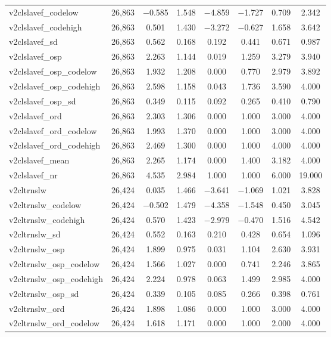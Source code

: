 \begin{table}[!htbp]
\begin{tabular}{@{\extracolsep{5pt}}lccccccc}
v2clslavef\_codelow & 26,863 & $-$0.585 & 1.548 & $-$4.859 & $-$1.727 & 0.709 & 2.342 \\ 
v2clslavef\_codehigh & 26,863 & 0.501 & 1.430 & $-$3.272 & $-$0.627 & 1.658 & 3.642 \\ 
v2clslavef\_sd & 26,863 & 0.562 & 0.168 & 0.192 & 0.441 & 0.671 & 0.987 \\ 
v2clslavef\_osp & 26,863 & 2.263 & 1.144 & 0.019 & 1.259 & 3.279 & 3.940 \\ 
v2clslavef\_osp\_codelow & 26,863 & 1.932 & 1.208 & 0.000 & 0.770 & 2.979 & 3.892 \\ 
v2clslavef\_osp\_codehigh & 26,863 & 2.598 & 1.158 & 0.043 & 1.736 & 3.590 & 4.000 \\ 
v2clslavef\_osp\_sd & 26,863 & 0.349 & 0.115 & 0.092 & 0.265 & 0.410 & 0.790 \\ 
v2clslavef\_ord & 26,863 & 2.303 & 1.306 & 0.000 & 1.000 & 3.000 & 4.000 \\ 
v2clslavef\_ord\_codelow & 26,863 & 1.993 & 1.370 & 0.000 & 1.000 & 3.000 & 4.000 \\ 
v2clslavef\_ord\_codehigh & 26,863 & 2.469 & 1.300 & 0.000 & 1.000 & 4.000 & 4.000 \\ 
v2clslavef\_mean & 26,863 & 2.265 & 1.174 & 0.000 & 1.400 & 3.182 & 4.000 \\ 
v2clslavef\_nr & 26,863 & 4.535 & 2.984 & 1.000 & 1.000 & 6.000 & 19.000 \\ 
v2cltrnslw & 26,424 & 0.035 & 1.466 & $-$3.641 & $-$1.069 & 1.021 & 3.828 \\ 
v2cltrnslw\_codelow & 26,424 & $-$0.502 & 1.479 & $-$4.358 & $-$1.548 & 0.450 & 3.045 \\ 
v2cltrnslw\_codehigh & 26,424 & 0.570 & 1.423 & $-$2.979 & $-$0.470 & 1.516 & 4.542 \\ 
v2cltrnslw\_sd & 26,424 & 0.552 & 0.163 & 0.210 & 0.428 & 0.654 & 1.096 \\ 
v2cltrnslw\_osp & 26,424 & 1.899 & 0.975 & 0.031 & 1.104 & 2.630 & 3.931 \\ 
v2cltrnslw\_osp\_codelow & 26,424 & 1.566 & 1.027 & 0.000 & 0.741 & 2.246 & 3.865 \\ 
v2cltrnslw\_osp\_codehigh & 26,424 & 2.224 & 0.978 & 0.063 & 1.499 & 2.985 & 4.000 \\ 
v2cltrnslw\_osp\_sd & 26,424 & 0.339 & 0.105 & 0.085 & 0.266 & 0.398 & 0.761 \\ 
v2cltrnslw\_ord & 26,424 & 1.898 & 1.086 & 0.000 & 1.000 & 3.000 & 4.000 \\ 
v2cltrnslw\_ord\_codelow & 26,424 & 1.618 & 1.171 & 0.000 & 1.000 & 2.000 & 4.000 \\ 

\end{tabular}
\end{table}
